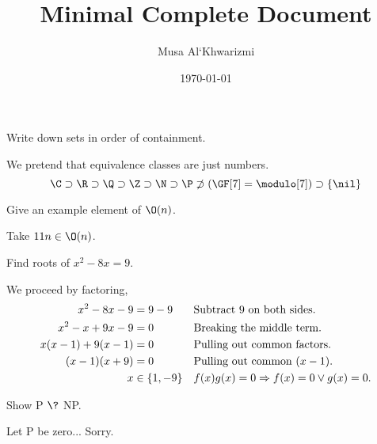 \documentclass{homework}
\author{Musa Al`Khwarizmi}
\date{\today}
\title{Minimal Complete Document}
\begin{document}
 \maketitle

\question Write down sets in order of containment.

We pretend that equivalence classes are just numbers.
\[
  \C \supset \R \supset \Q \supset \Z \supset \N \supset \P \not\supset (\GF[7] = \modulo[7])  \supset \{\nil\}
\]

\question Give an example element of $\O(n)$.

Take $11n \in \O(n)$.

\question Find roots of $x^2- 8x = 9$.

We proceed by factoring,
\begin{align*}
  x^2- 8x - 9         & = 9-9         &  & \text{Subtract 9 on both sides.}         \\
  x^2- x + 9x - 9     & = 0           &  & \text{Breaking the middle term.}         \\
  x(x - 1) + 9(x - 1) & = 0           &  & \text{Pulling out common factors.}       \\
  (x - 1)(x + 9)      & = 0           &  & \text{Pulling out common } (x - 1).      \\
  x                   & \in \{1, -9\} &  & f(x)g(x) = 0 \Rightarrow f(x) = 0 \vee g(x) = 0. \\
\end{align*}

\question Show P $\?$ NP.

Let P be zero... Sorry.
\end{document}
